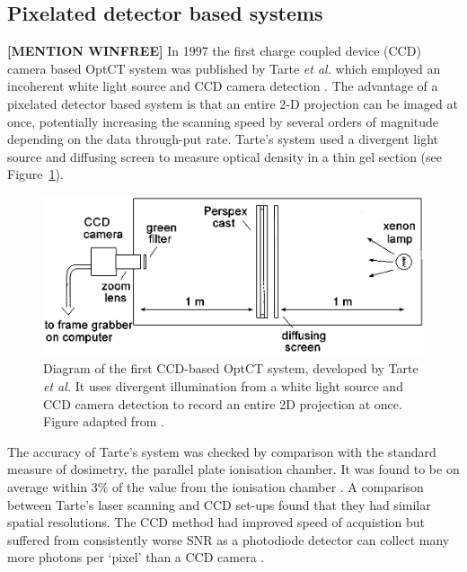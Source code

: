 \documentclass[12pt]{article}
\begin{document}
\subsection{Pixelated detector based systems}
\textbf{[MENTION WINFREE]}
In 1997 the first charge coupled device (CCD) camera based OptCT system was published by Tarte \textit{et al.} which employed an incoherent white light source and CCD camera detection \cite{Tarte:2007}. The advantage  of a pixelated detector based system  is that an entire 2-D projection can be imaged at once, potentially increasing the scanning speed by several  orders of magnitude depending on the data through-put rate. Tarte's system used a divergent light source and diffusing screen to measure optical density in a thin gel section (see Figure~\ref{fig:tarte_ccd_setup}). 

\begin{figure}[H]
\centering
\includegraphics[scale=0.4]{Tarte_1997_ccdsetup.jpg}
\caption{Diagram of the first CCD-based  OptCT system, developed by Tarte \textit{et al.} It uses  divergent illumination from a white light source and CCD camera detection to record an entire 2D projection at once.   Figure adapted from \cite{Tarte:2007}. }
\label{fig:tarte_ccd_setup}
\end{figure}


The accuracy of Tarte's system  was checked by comparison with the standard measure of dosimetry, the parallel plate ionisation chamber. It was found to be on average within 3\% of the value from the ionisation chamber \cite{Tarte:2007}. A comparison between Tarte's laser scanning and CCD set-ups found that they had similar spatial resolutions. The CCD method had improved speed of acquistion but suffered from consistently worse SNR as a photodiode detector can collect many more photons per `pixel' than a CCD camera \cite{Tarte:2007}.
\end{document}
